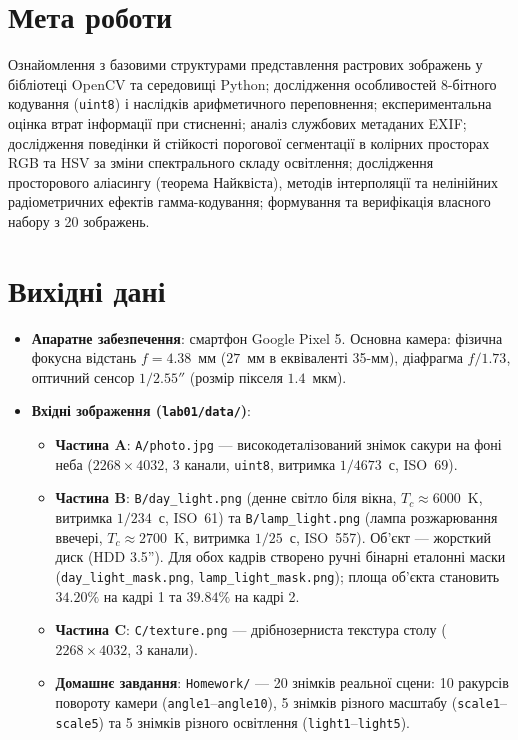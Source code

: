 \documentclass[14pt, a4paper]{extarticle}
\begin{document}


\section{Мета роботи}
Ознайомлення з базовими структурами представлення растрових зображень у бібліотеці OpenCV та середовищі Python; дослідження особливостей 8-бітного кодування (\texttt{uint8}) і наслідків арифметичного переповнення; експериментальна оцінка втрат інформації при стисненні; аналіз службових метаданих EXIF; дослідження поведінки й стійкості порогової сегментації в колірних просторах RGB та HSV за зміни спектрального складу освітлення; дослідження просторового аліасингу (теорема Найквіста), методів інтерполяції та нелінійних радіометричних ефектів гамма-кодування; формування та верифікація власного набору з 20 зображень.

\section{Вихідні дані}
\begin{itemize}
    \item \textbf{Апаратне забезпечення}: смартфон Google Pixel 5. Основна камера: фізична фокусна відстань $f = 4.38$~мм ($27$~мм в еквіваленті 35-мм), діафрагма $f/1.73$, оптичний сенсор $1/2.55''$ (розмір пікселя $1.4$~мкм).
    \item \textbf{Вхідні зображення (\texttt{lab01/data/})}:
    \begin{itemize}
        \item \textbf{Частина A}: \texttt{A/photo.jpg} --- високодеталізований знімок сакури на фоні неба ($2268 \times 4032$, 3 канали, \texttt{uint8}, витримка $1/4673$~с, ISO~69).
        \item \textbf{Частина B}: \texttt{B/day\_light.png} (денне світло біля вікна, $T_c \approx 6000$~K, витримка $1/234$~с, ISO~61) та \texttt{B/lamp\_light.png} (лампа розжарювання ввечері, $T_c \approx 2700$~K, витримка $1/25$~с, ISO~557). Об'єкт --- жорсткий диск (HDD 3.5''). Для обох кадрів створено ручні бінарні еталонні маски (\texttt{day\_light\_mask.png}, \texttt{lamp\_light\_mask.png}); площа об'єкта становить $34.20\%$ на кадрі 1 та $39.84\%$ на кадрі 2.
        \item \textbf{Частина C}: \texttt{C/texture.png} --- дрібнозерниста текстура столу ($2268 \times 4032$, 3 канали).
        \item \textbf{Домашнє завдання}: \texttt{Homework/} --- 20 знімків реальної сцени: 10 ракурсів повороту камери (\texttt{angle1}--\texttt{angle10}), 5 знімків різного масштабу (\texttt{scale1}--\texttt{scale5}) та 5 знімків різного освітлення (\texttt{light1}--\texttt{light5}).
    \end{itemize}
\end{itemize}
\end{document}
